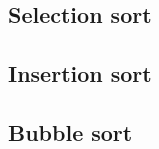 \documentclass[../main.tex]{subfiles}
\begin{document}
\subsection{Selection sort}\label{sec:selection_sort}



\subsection{Insertion sort}\label{sec:selection_sort}


\subsection{Bubble sort}\label{sec:selection_sort}
\end{document}
